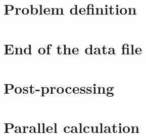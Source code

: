 \documentclass[a4paper,11pt,english]{report}
\begin{document}
%
\chapter{Problem definition}
%




%
\chapter{End of the data file}
%




%
\chapter{Post-processing}
%




%
\chapter{Parallel calculation} \label{parallel}
%




\end{document}
